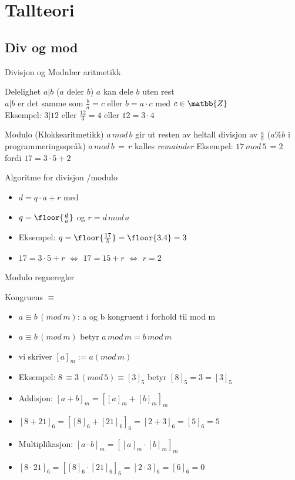 \section{Tallteori}
\subsection*{Div og mod}

\begin{frame}{Divisjon og Modulær aritmetikk}
\begin{block}{Delelighet $a|b$ ($a$ deler $b$)}
$a$ kan dele $b$ uten rest\\
$a|b$ er det samme som $\frac{b}{a}=c$ eller $b=a\cdot c$ med $c \in \matbb{Z}$\\
Eksempel: $3|12$ eller $\frac{12}{3} = 4$ eller $12=3\cdot 4$
\end{block}
\pause
\begin{block}{Modulo (Klokkearitmetikk)}
$a\, mod\, b$ gir ut resten av heltall divisjon av $\frac{a}{b}$ ($a\%b$ i programmeringsspråk)
$a\, mod\, b\, =\, r$ kalles \textit{remainder}
Eksempel: $17\, mod\, 5\, = 2$ fordi $17=3\cdot 5+2$ 
\end{block}
\end{frame}

\begin{frame}[fragile]{Algoritme for divisjon /modulo}
\begin{itemize}[<+->]
\item $d=q\cdot a + r$ med
\item $q=\floor{\frac{d}{a}}$ og $r=d\, mod\, a$
\item Eksempel: $q=\floor{\frac{17}{5}} = \floor{3.4}=3$
\item $17=3\cdot 5 + r$ $\iff$ $17=15+r$ $\iff$ $r=2$
\end{itemize}
\end{frame}

\begin{frame}{Modulo regneregler}
\begin{block}{Kongruens $\equiv$}
\begin{itemize}
\item $a \equiv b\, (mod\, m)$: a og b kongruent i forhold til mod m
\item $a \equiv b\, (mod\, m)$ betyr $a\, mod\, m=b\, mod\, m$
\item vi skriver $[a]_m := a (mod\, m)$
\item Eksempel: $8\, \equiv 3\, (mod\, 5) \equiv [3]_5$ betyr $[8]_5=3=[3]_5$ 
\end{itemize}
\end{block}
\pause
\begin{itemize}[<+->]
\item Addisjon: $[a+b]_m = [[a]_m + [b]_m]_m$
\item $[8+21]_6 = [[8]_6 + [21]_6]_6 = [2 + 3]_6 = [5]_6 = 5$
\item Multiplikasjon: $[a\cdot b]_m = [[a]_m \cdot [b]_m]_m$
\item $[8 \cdot 21]_6 = [[8]_6 \cdot [21]_6]_6 = [2 \cdot 3]_6 = [6]_6 = 0$
\end{itemize}
\end{frame}


